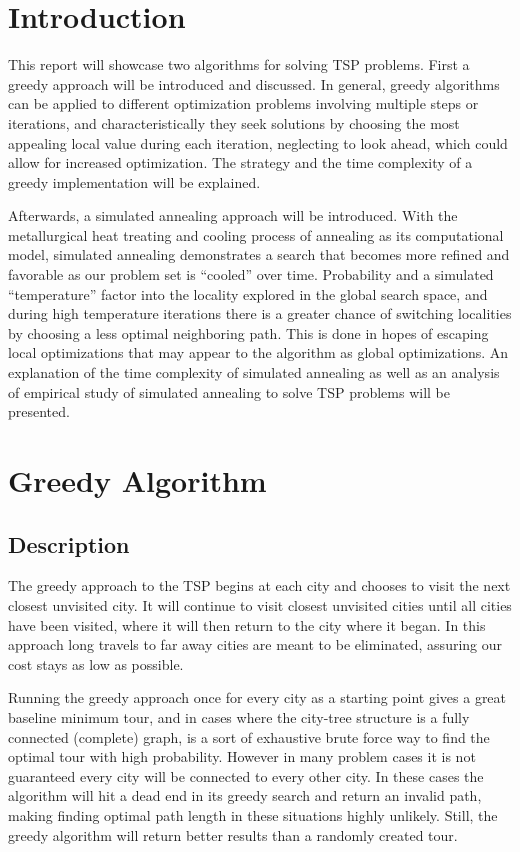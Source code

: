 \documentclass{article}
\begin{document}
\begin{multicols}{2}
    \section{Introduction}

    This report will showcase two algorithms for solving TSP problems. First a greedy approach will be introduced and discussed.  In general, greedy algorithms can be applied to different optimization problems involving multiple steps or iterations, and characteristically they seek solutions by choosing the most appealing local value during each iteration, neglecting to look ahead, which could allow for increased optimization.  The strategy and the time complexity of a greedy implementation will be explained.
    
	Afterwards, a simulated annealing approach will be introduced.  With the metallurgical heat treating and cooling process of annealing as its computational model, simulated annealing demonstrates a search that becomes more refined and favorable as our problem set is “cooled” over time.  Probability and a simulated “temperature” factor into the locality explored in the global search space, and during high temperature iterations there is a greater chance of switching localities by choosing a less optimal neighboring path.  This is done in hopes of escaping local optimizations that may appear to the algorithm as global optimizations.  An explanation of the time complexity of simulated annealing as well as an analysis of empirical study of simulated annealing to solve TSP problems will be presented.

    \section{Greedy Algorithm}
    \subsection{Description}

    The greedy approach to the TSP begins at each city and chooses to visit the next closest unvisited city.  It will continue to visit closest unvisited cities until all cities have been visited, where it will then return to the city where it began.  In this approach long travels to far away cities are meant to be eliminated, assuring our cost stays as low as possible.  

    Running the greedy approach once for every city as a starting point gives a great baseline minimum tour, and in cases where the city-tree structure is a fully connected (complete) graph, is a sort of exhaustive brute force way to find the optimal tour with high probability.  However in many problem cases it is not guaranteed every city will be connected to every other city.  In these cases the algorithm will hit a dead end in its greedy search and return an invalid path, making finding optimal path length in these situations highly unlikely.  Still, the greedy algorithm will return better results than a randomly created tour.   


\end{multicols}
\end{document}
